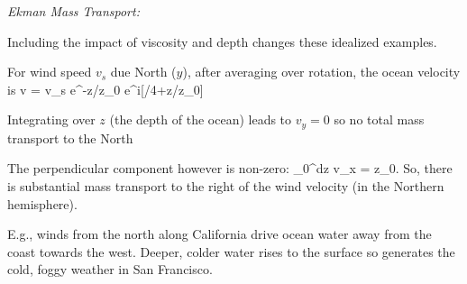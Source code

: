 \documentclass[11pt]{book}
\begin{document}
\item {\it Ekman Mass Transport:} 
\bee
\item Including the impact of viscosity and depth changes these idealized examples.
\item For wind speed $v_s$ due North ($\hat y$), after averaging over rotation, the ocean velocity is
\be \vec v = v_s  e^{-z/z_0} e^{i[\pi/4+z/z_0]}\ee
\item Integrating over $z$ (the depth of the ocean) leads to $v_y=0$ so no total mass transport to the North
\item The perpendicular component however is non-zero:
\be
\int_0^\infty dz v_x =  z_0.\ee
So, there is substantial mass transport to the right of the wind velocity (in the Northern hemisphere). 
\item E.g., winds from the north along California drive ocean water away from the coast towards the west. Deeper, colder water rises to the surface so generates the cold, foggy weather in San Francisco.
\eee
\eei
\end{document}
